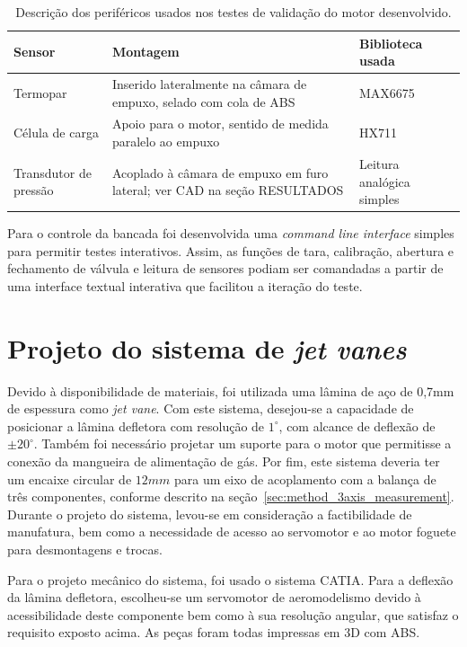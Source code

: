 
\begin{table}[htbp]
    \centering\begin{tabular}{p{}p{}p{}} \toprule
        Sensor & Montagem & Biblioteca usada \\ \midrule
        Termopar & Inserido lateralmente na câmara de empuxo, selado com cola de ABS & MAX6675 \\
        Célula de carga & Apoio para o motor, sentido de medida paralelo ao empuxo & HX711 \\
        Transdutor de pressão & Acoplado à câmara de empuxo em furo lateral; ver CAD na seção RESULTADOS & Leitura analógica simples \\ \bottomrule
    \end{tabular}
    \caption{Descrição dos periféricos usados nos testes de validação do motor desenvolvido.}\label{tab:validation_peripherals}
\end{table}

Para o controle da bancada foi desenvolvida uma \textit{command line interface} simples para permitir testes interativos. Assim, as funções de tara, calibração, abertura e fechamento de válvula e leitura de sensores podiam ser comandadas a partir de uma interface textual interativa que facilitou a iteração do teste.

\section{Projeto do sistema de \textit{jet vanes}}\label{sec:method_jet_vanes}

Devido à disponibilidade de materiais, foi utilizada uma lâmina de aço de 0,7mm de espessura como \textit{jet vane}. Com este sistema, desejou-se a capacidade de posicionar a lâmina defletora com resolução de \(1^\circ \), com alcance de deflexão de \(\pm 20^\circ \). Também foi necessário projetar um suporte para o motor que permitisse a conexão da mangueira de alimentação de gás. Por fim, este sistema deveria ter um encaixe circular de \(12mm\) para um eixo de acoplamento com a balança de três componentes, conforme descrito na seção~\ref{sec:method_3axis_measurement}. Durante o projeto do sistema, levou-se em consideração a factibilidade de manufatura, bem como a necessidade de acesso ao servomotor e ao motor foguete para desmontagens e trocas.

Para o projeto mecânico do sistema, foi usado o sistema CATIA\@. Para a deflexão da lâmina defletora, escolheu-se um servomotor de aeromodelismo devido à acessibilidade deste componente bem como à sua resolução angular, que satisfaz o requisito exposto acima. As peças foram todas impressas em 3D com ABS\@.

